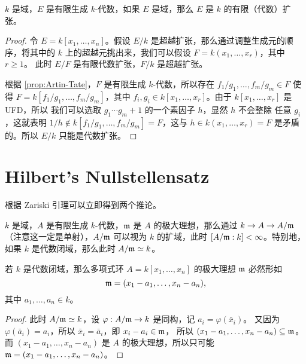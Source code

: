 \begin{proposition}[Zariski 引理]\label{prop:Zariski lemma 2}
  $k$ 是域，$E$ 是有限生成 $k$-代数，如果 $E$ 是域，那么 $E$ 是 $k$
  的有限（代数）扩张。
\end{proposition}
\begin{proof}
  令 $E=k[x_1,\dots,x_n]$。假设 $E/k$ 是超越扩张，那么通过调整生成元的顺序，将其中的
  $k$ 上的超越元挑出来，我们可以假设 $F=k(x_1,\dots,x_r)$，其中 $r\geq 1$。
  此时 $E/F$ 是有限代数扩张，$F/k$ 是超越扩张。
  
  根据 \autoref{prop:Artin-Tate}，$F$ 是有限生成 $k$-代数，所以存在 
  $f_1/g_1,\dots,f_m/g_m\in F$ 使得 $F=k[f_1/g_1,\dots,f_m/g_m]$，其中
  $f_i,g_i\in k[x_1,\dots,x_r]$。由于 $k[x_1,\dots,x_r]$ 是 UFD，所以
  我们可以选取 $g_1\cdots g_m+1$ 的一个素因子 $h$，显然 $h$ 不会整除
  任意 $g_i$，这就表明 $1/h\notin k[f_1/g_1,\dots,f_m/g_m]=F$，这与
  $h\in k(x_1,\dots,x_r)=F$ 是矛盾的。所以 $E/k$ 只能是代数扩张。
\end{proof}

\section{Hilbert's Nullstellensatz}

根据 Zariski 引理可以立即得到两个推论。

\begin{corollary}
  $k$ 是域，$A$ 是有限生成 $k$-代数，$\mathfrak{m}$ 是 $A$ 的极大理想，那么通过
  $k\to A\to A/\mathfrak{m}$（注意这一定是单射），$A/\mathfrak{m}$ 可以视为 $k$
  的扩域，此时 $[A/\mathfrak{m}:k]<\infty$。特别地，如果 $k$ 是代数闭域，那么此时
  $A/\mathfrak{m}\simeq k$。
\end{corollary}

\begin{corollary}\label{coro:max ideal of polynomial ring over algebraically closed field}
  若 $k$ 是代数闭域，那么多项式环 $A=k[x_1,\dots,x_n]$ 的极大理想 $\mathfrak{m}$
  必然形如
  \[
    \mathfrak{m}=(x_1-a_1,\dots,x_n-a_n),  
  \]
  其中 $a_1,\dots,a_n\in k$。
\end{corollary}
\begin{proof}
  此时 $A/\mathfrak{m}\simeq k$，设 $\varphi:A/\mathfrak{m}\to k$ 是同构，记 $a_i=\varphi(\bar{x}_i)$。
  又因为 $\varphi(\bar{a}_i)=a_i$，所以 $\bar{x}_i=\bar{a}_i$，即 $x_i-a_i\in\mathfrak{m}$，
  所以 $(x_1-a_1,\dots,x_n-a_n)\subseteq\mathfrak{m}$。而 $(x_1-a_1,\dots,x_n-a_n)$
  是 $A$ 的极大理想，所以只可能 $\mathfrak{m}=(x_1-a_1,\dots,x_n-a_n)$。
\end{proof}

